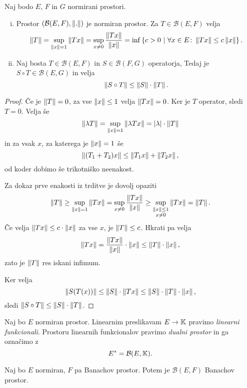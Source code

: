\begin{trditev}
Naj bodo $E$, $F$ in $G$ normirani prostori.

\begin{enumerate}[i)]
\item Prostor $(\mathcal{B}(E,F), \left\lVert .\right\rVert)$ je normiran prostor.
Za $T \in \mathcal{B}(E,F)$ velja
\[
\left\lVert T\right\rVert =
\sup_{\left\lVert x\right\rVert=1} \left\lVert Tx\right\rVert =
\sup_{x \ne 0} \frac{\left\lVert Tx\right\rVert}{\left\lVert x\right\rVert} =
\inf \left\{c > 0~\middle\vert~\forall x \in E \colon \left\lVert Tx\right\rVert \leq c \left\lVert x\right\rVert\right\}.
\]
\item Naj bosta $T \in \mathcal{B}(E,F)$ in
$S \in \mathcal{B}(F,G)$ operatorja, Tedaj je
$S \circ T \in \mathcal{B}(E,G)$ in velja
\[
\left\lVert S \circ T\right\rVert \leq \left\lVert S\right\rVert \cdot \left\lVert T\right\rVert.
\]
\end{enumerate}
\end{trditev}


\begin{proof}
Če je $\left\lVert T\right\rVert = 0$, za vse $\left\lVert x\right\rVert \leq 1$ velja
$\left\lVert Tx\right\rVert = 0$. Ker je $T$ operator, sledi $T = 0$. Velja še
\[
\left\lVert \lambda T\right\rVert = \sup_{\left\lVert x\right\rVert=1} \left\lVert \lambda Tx\right\rVert =
\left\lvert \lambda\right\rvert \cdot \left\lVert T\right\rVert
\]
in za vsak $x$, za katerega je $\left\lVert x\right\rVert=1$ še
\[
\left\lVert (T_1 + T_2)x\right\rVert \leq \left\lVert T_1x\right\rVert + \left\lVert T_2x\right\rVert,
\]
od koder dobimo še trikotniško neenakost.

Za dokaz prve enakosti iz trditve je dovolj opaziti
\[
\left\lVert T\right\rVert \geq \sup_{\left\lVert x\right\rVert=1} \left\lVert Tx\right\rVert =
\sup_{x \ne 0} \frac{\left\lVert Tx\right\rVert}{\left\lVert x\right\rVert} \geq
\sup_{\substack{\left\lVert x\right\rVert \leq 1 \\ x \ne 0}} \left\lVert Tx\right\rVert = \left\lVert T\right\rVert.
\]
Če velja $\left\lVert Tx\right\rVert \leq c \cdot \left\lVert x\right\rVert$ za vse $x$, je
$\left\lVert T\right\rVert \leq c$. Hkrati pa velja
\[
\left\lVert Tx\right\rVert =
\frac{\left\lVert Tx\right\rVert}{\left\lVert x\right\rVert} \cdot \left\lVert x\right\rVert \leq
\left\lVert T\right\rVert \cdot \left\lVert x\right\rVert,
\]
zato je $\left\lVert T\right\rVert$ res iskani infimum.

Ker velja
\[
\left\lVert S(T(x))\right\rVert \leq \left\lVert S\right\rVert \cdot \left\lVert Tx\right\rVert \leq
\left\lVert S\right\rVert \cdot \left\lVert T\right\rVert \cdot \left\lVert x\right\rVert,
\]
sledi $\left\lVert S \circ T\right\rVert \leq \left\lVert S\right\rVert \cdot \left\lVert T\right\rVert$.
\end{proof}

\begin{definicija}
Naj bo $E$ normiran prostor. Linearnim preslikavam $E \to \mathbb{K}$
pravimo \emph{linearni funkcionali}.
Prostoru linearnih funkcionalov pravimo
\emph{dualni prostor} in ga
označimo z
\[
E^* = \mathcal{B}(E,\mathbb{K}).
\]
\end{definicija}

\begin{izrek}
Naj bo $E$ normiran, $F$ pa Banachov prostor. Potem je
$\mathcal{B}(E,F)$ Banachov prostor.
\end{izrek}

